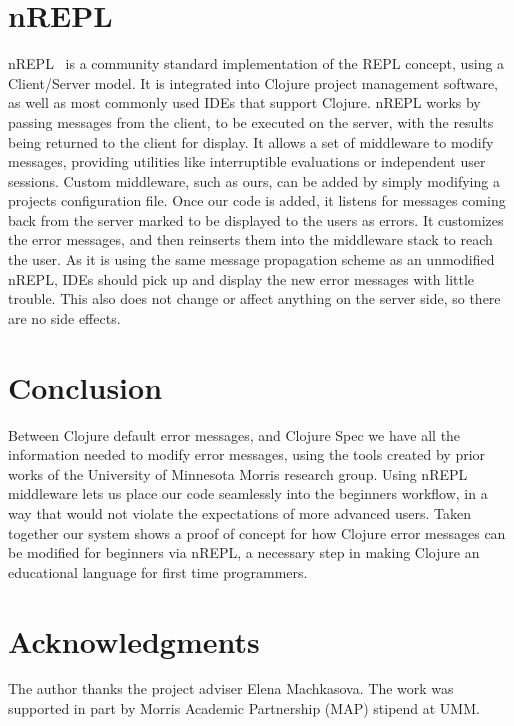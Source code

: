 \documentclass[12pt]{article}
\begin{document}
\section{nREPL}
nREPL~\cite{nrepl} is a community standard implementation of the REPL concept,
 using a
\newline
Client/Server model.
It is integrated into Clojure project management software, as well as most commonly used IDEs
that support Clojure.
nREPL works by passing messages from the client, to be executed on the server, with the results
being returned to the client for display.
It allows a set of middleware to modify messages, providing utilities
like interruptible evaluations or independent user sessions.
Custom middleware, such as ours, can be added by simply
modifying a projects configuration file. Once our code is added,
it listens for messages coming back from the server
marked to be displayed to the users as errors.
It customizes the error messages, and then reinserts them into the middleware stack
to reach the user. As it is using the same message propagation scheme as an unmodified nREPL,
IDEs should pick up and display the new error messages with little trouble.
This also does not change or affect anything on the server side, so there are no side effects.

\section{Conclusion}
Between Clojure default error messages, and Clojure Spec
we have all the information needed to modify error messages, using the
tools created by prior works of the University of Minnesota Morris research group. %
Using nREPL middleware lets us place our code seamlessly into the beginners
workflow, in a way that would not violate the expectations of more advanced users.
 Taken together our system shows a proof of concept for how Clojure
error messages can be modified for beginners via nREPL, a necessary step in making
Clojure an educational language for first time programmers.


\section{Acknowledgments}
The author thanks the project adviser  Elena Machkasova.
The work was supported in part by Morris Academic Partnership (MAP) stipend at UMM.



\end{document}
